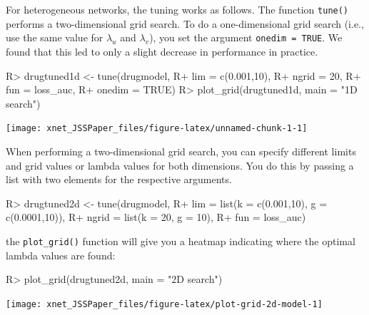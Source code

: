 \documentclass[
]{article}
\begin{document}
For heterogeneous networks, the tuning works as follows. The function
\texttt{tune()} performs a two-dimensional grid search. To do a
one-dimensional grid search (i.e., use the same value for \(\lambda_u\)
and \(\lambda_v\)), you set the argument \texttt{onedim\ =\ TRUE}. We
found that this led to only a slight decrease in performance in
practice.

\begin{CodeChunk}

\begin{CodeInput}
R> drugtuned1d <- tune(drugmodel,
R+                     lim = c(0.001,10),
R+                     ngrid = 20,
R+                     fun = loss_auc,
R+                     onedim = TRUE)
R> plot_grid(drugtuned1d, main = "1D search")
\end{CodeInput}


\begin{center}\texttt{[image: xnet\_JSSPaper\_files/figure-latex/unnamed-chunk-1-1]} \end{center}

\end{CodeChunk}

When performing a two-dimensional grid search, you can specify different
limits and grid values or lambda values for both dimensions. You do this
by passing a list with two elements for the respective arguments.

\begin{CodeChunk}

\begin{CodeInput}
R> drugtuned2d <- tune(drugmodel,
R+                      lim = list(k = c(0.001,10), g = c(0.0001,10)),
R+                      ngrid = list(k = 20, g = 10),
R+                      fun = loss_auc)
\end{CodeInput}
\end{CodeChunk}

the \texttt{plot\_grid()} function will give you a heatmap indicating
where the optimal lambda values are found:

\begin{CodeChunk}

\begin{CodeInput}
R> plot_grid(drugtuned2d, main = "2D search")
\end{CodeInput}


\begin{center}\texttt{[image: xnet\_JSSPaper\_files/figure-latex/plot-grid-2d-model-1]} \end{center}

\end{CodeChunk}
\end{document}
